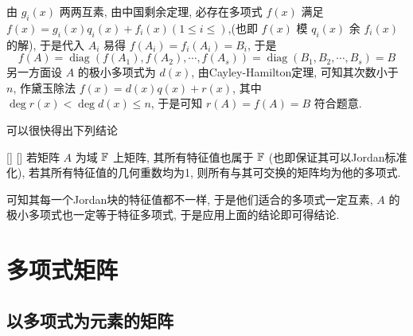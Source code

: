\documentclass[UTF8]{ctexart}
\DeclareMathOperator{\0}{\mathbf{0}}
\DeclareMathOperator{\<}{\langle}
\renewcommand{\>}{\rangle}
\DeclareMathOperator{\diag}{diag}
\begin{document}
		\begin{prf}
			由 \(g_i(x)\) 两两互素, 由中国剩余定理, 必存在多项式 \(f(x)\) 满足 \(f(x)=g_i(x)q_i(x)+f_i(x)(1\leq i\leq)\),(也即 \(f(x)\) 模 \(q_i(x)\) 余 \(f_i(x)\) 的解), 于是代入 \(A_i\) 易得 \(f(A_i)=f_i(A_i)=B_i\), 于是
			\[f(A)=\diag(f(A_1),f(A_2),\cdots,f(A_s))=\diag(B_1,B_2,\cdots,B_s)=B\]
			另一方面设 \(A\) 的极小多项式为 \(d(x)\), 由Cayley-Hamilton定理, 可知其次数小于 \(n\), 作黛玉除法 \(f(x)=d(x)q(x)+r(x)\), 其中 \(\deg r(x)<\deg d(x)\leq n\), 于是可知 \(r(A)=f(A)=B\) 符合题意.
		\end{prf}
		可以很快得出下列结论
		\begin{crl}
			[]
			{}
			[]
			[]
			若矩阵 \(A\) 为域 \(\operatorname{\mathbb{F}}\) 上矩阵, 其所有特征值也属于 \(\operatorname{\mathbb{F}}\) (也即保证其可以Jordan标准化), 若其所有特征值的几何重数均为1, 则所有与其可交换的矩阵均为他的多项式.
		\end{crl}

		\begin{prf}
			可知其每一个Jordan块的特征值都不一样, 于是他们适合的多项式一定互素,  \(A\) 的极小多项式也一定等于特征多项式, 于是应用上面的结论即可得结论.
		\end{prf}

\section{多项式矩阵}

    \subsection{以多项式为元素的矩阵}
    
\end{document}
